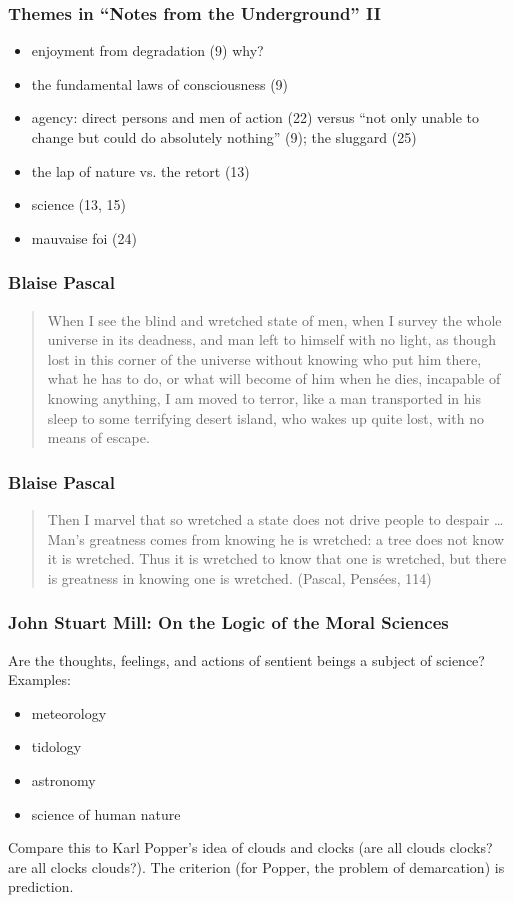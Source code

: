 \documentclass[xcolor=dvipsnames]{beamer}
\begin{document}
\begin{frame}
  \frametitle{Themes in ``Notes from the Underground'' II}
  \begin{itemize}
  \item enjoyment from degradation (9) why?
  \item the fundamental laws of consciousness (9)
  \item agency: direct persons and men of action (22) versus ``not
    only unable to change but could do absolutely nothing'' (9);
    the sluggard (25)
  \item the lap of nature vs. the retort (13)
  \item science (13, 15)
  \item mauvaise foi (24)
  \end{itemize}
\end{frame}

\begin{frame}
  \frametitle{Blaise Pascal}
  \begin{quote}
    When I see the blind and wretched state of men, when I survey
    the whole universe in its deadness, and man left to himself
    with no light, as though lost in this corner of the universe
    without knowing who put him there, what he has to do, or what
    will become of him when he dies, incapable of knowing
    anything, I am moved to terror, like a man transported in his
    sleep to some terrifying desert island, who wakes up quite
    lost, with no means of escape.
  \end{quote}
\end{frame}

\begin{frame}
  \frametitle{Blaise Pascal}
  \begin{quote}
    Then I marvel that so wretched a state does not drive people
    to despair {\ldots} Man's greatness comes from knowing he is
    wretched: a tree does not know it is wretched. Thus it is
    wretched to know that one is wretched, but there is greatness
    in knowing one is wretched. (Pascal, Pens{\'e}es, 114)
  \end{quote}
\end{frame}

\begin{frame}
  \frametitle{John Stuart Mill: On the Logic of the Moral Sciences}
  Are the thoughts, feelings, and actions of sentient beings a subject
  of science? Examples:
  \begin{itemize}
  \item meteorology
  \item tidology
  \item astronomy
  \item science of human nature
  \end{itemize}
Compare this to Karl Popper's idea of clouds and clocks (are all
clouds clocks? are all clocks clouds?). The criterion (for Popper, the
problem of demarcation) is prediction.
\end{frame}
\end{document}
